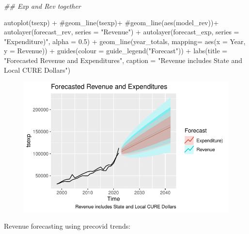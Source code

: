 \documentclass[
  letterpaper,
  DIV=11,
  numbers=noendperiod]{scrreport}
\newenvironment{Shaded}{\begin{snugshade}}{\end{snugshade}}
\newcommand{\AttributeTok}[1]{\textcolor[rgb]{0.40,0.45,0.13}{#1}}
\newcommand{\CommentTok}[1]{\textcolor[rgb]{0.37,0.37,0.37}{#1}}
\newcommand{\DocumentationTok}[1]{\textcolor[rgb]{0.37,0.37,0.37}{\textit{#1}}}
\newcommand{\FloatTok}[1]{\textcolor[rgb]{0.68,0.00,0.00}{#1}}
\newcommand{\FunctionTok}[1]{\textcolor[rgb]{0.28,0.35,0.67}{#1}}
\newcommand{\NormalTok}[1]{\textcolor[rgb]{0.00,0.23,0.31}{#1}}
\newcommand{\SpecialCharTok}[1]{\textcolor[rgb]{0.37,0.37,0.37}{#1}}
\newcommand{\StringTok}[1]{\textcolor[rgb]{0.13,0.47,0.30}{#1}}
\begin{document}
\begin{Shaded}
\begin{Highlighting}[]
\DocumentationTok{\#\# Exp and Rev together}

\FunctionTok{autoplot}\NormalTok{(tsexp) }\SpecialCharTok{+}
  \CommentTok{\#geom\_line(tsexp)+}
  \CommentTok{\#geom\_line(aes(model\_rev))+}
  \FunctionTok{autolayer}\NormalTok{(forecast\_rev, }\AttributeTok{series =} \StringTok{"Revenue"}\NormalTok{) }\SpecialCharTok{+}
  \FunctionTok{autolayer}\NormalTok{(forecast\_exp, }\AttributeTok{series =} \StringTok{"Expenditure)"}\NormalTok{, }\AttributeTok{alpha =} \FloatTok{0.5}\NormalTok{) }\SpecialCharTok{+}
  \FunctionTok{geom\_line}\NormalTok{(year\_totals, }\AttributeTok{mapping=} \FunctionTok{aes}\NormalTok{(}\AttributeTok{x =}\NormalTok{ Year, }\AttributeTok{y =}\NormalTok{ Revenue))  }\SpecialCharTok{+} \FunctionTok{guides}\NormalTok{(}\AttributeTok{colour =} \FunctionTok{guide\_legend}\NormalTok{(}\StringTok{"Forecast"}\NormalTok{)) }\SpecialCharTok{+} 
  \FunctionTok{labs}\NormalTok{(}\AttributeTok{title =} \StringTok{"Forecasted Revenue and Expenditures"}\NormalTok{, }\AttributeTok{caption =} \StringTok{"Revenue includes State and Local CURE Dollars"}\NormalTok{)}
\end{Highlighting}
\end{Shaded}

\begin{figure}[H]

{\centering \includegraphics{./Everything_files/figure-pdf/unnamed-chunk-30-3.pdf}

}

\end{figure}

Revenue forecasting using precovid trends:
\end{document}
